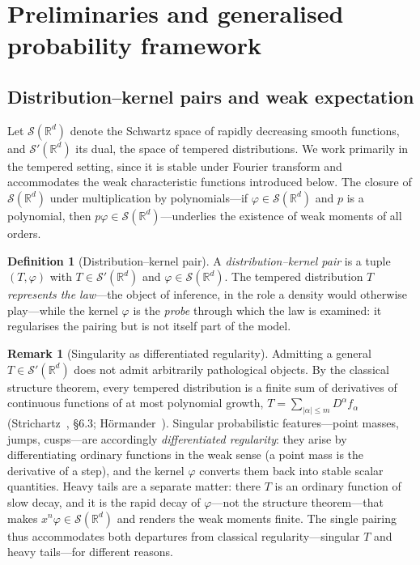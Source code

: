 \documentclass[12pt]{article}
\theoremstyle{definition}
\newtheorem{definition}[theorem]{Definition}
\newtheorem{remark}[theorem]{Remark}
\newcommand{\R}{\mathbb{R}}
\begin{document}
\section{Preliminaries and generalised probability framework}
\label{sec:preliminaries}

\subsection{Distribution--kernel pairs and weak expectation}
\label{subsec:preliminaries_spaces}

Let $\mathcal{S}(\R^d)$ denote the Schwartz space of rapidly decreasing smooth functions, and $\mathcal{S}'(\R^d)$ its dual, the space of tempered distributions.  We work primarily in the tempered setting, since it is stable under Fourier transform and accommodates the weak characteristic functions introduced below.  The closure of $\mathcal{S}(\R^d)$ under multiplication by polynomials---if $\varphi\in\mathcal{S}(\R^d)$ and $p$ is a polynomial, then $p\varphi\in\mathcal{S}(\R^d)$---underlies the existence of weak moments of all orders.

\begin{definition}[Distribution--kernel pair]
A \emph{distribution--kernel pair} is a tuple $(T,\varphi)$ with $T \in \mathcal{S}'(\R^d)$ and $\varphi \in \mathcal{S}(\R^d)$.  The tempered distribution $T$ \emph{represents the law}---the object of inference, in the role a density would otherwise play---while the kernel $\varphi$ is the \emph{probe} through which the law is examined: it regularises the pairing but is not itself part of the model.
\end{definition}

\begin{remark}[Singularity as differentiated regularity]\label{rem:structure}
Admitting a general $T\in\mathcal{S}'(\R^d)$ does not admit arbitrarily
pathological objects.  By the classical structure theorem, every tempered
distribution is a finite sum of derivatives of continuous functions of at most
polynomial growth, $T=\sum_{|\alpha|\le m}D^\alpha f_\alpha$
(Strichartz~\cite{Strichartz2003}, \S6.3; H\"ormander~\cite{Hormander1990}).
Singular probabilistic features---point masses, jumps, cusps---are accordingly
\emph{differentiated regularity}: they arise by differentiating ordinary
functions in the weak sense (a point mass is the derivative of a step), and the
kernel $\varphi$ converts them back into stable scalar quantities.  Heavy tails
are a separate matter: there $T$ is an ordinary function of slow decay, and it
is the rapid decay of $\varphi$---not the structure theorem---that makes
$x^n\varphi\in\mathcal{S}(\R^d)$ and renders the weak moments finite.  The
single pairing thus accommodates both departures from classical
regularity---singular $T$ and heavy tails---for different reasons.
\end{remark}
\end{document}
